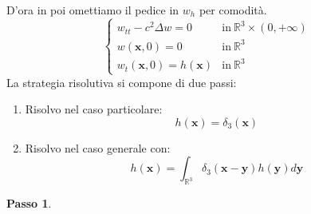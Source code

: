\documentclass[10pt,a4paper,twoside,openright]{book}
\begin{document}
D'ora in poi omettiamo il pedice in $\displaystyle w_{h}$ per comodità.
\begin{equation*}
	\begin{cases}
		w_{tt} -c^{2} \Delta w=0            & \text{in} \ \mathbb{R}^{3} \times ( 0,+\infty ) \\
		w(\mathbf{x} ,0) =0                 & \text{in} \ \mathbb{R}^{3}                      \\
		w_{t}(\mathbf{x} ,0) =h(\mathbf{x}) & \text{in} \ \mathbb{R}^{3}                      
	\end{cases}
\end{equation*}
La strategia risolutiva si compone di due passi:
\begin{enumerate}
	\item Risolvo nel caso particolare:
		\begin{equation*}
			h(\mathbf{x}) =\delta _{3}(\mathbf{x})
		\end{equation*}
	\item Risolvo nel caso generale con:
		\begin{equation*}
			h(\mathbf{x}) =\int _{\mathbb{R}^{3}} \delta _{3}(\mathbf{x} -\mathbf{y}) h(\mathbf{y}) d\mathbf{y}
		\end{equation*}
\end{enumerate}



\textbf{Passo 1}.
\end{document}
